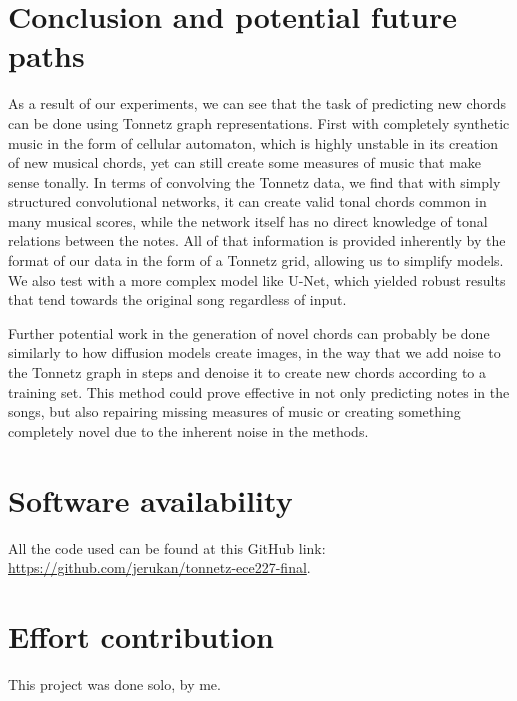 \documentclass[
	a4paper, %
	10pt, %
	unnumberedsections, %
	twoside, %
]{LTJournalArticle}
\begin{document}
\section{Conclusion and potential future paths}

As a result of our experiments, we can see that the task of predicting new chords can be done using Tonnetz graph representations. First with completely synthetic music in the form of cellular automaton, which is highly unstable in its creation of new musical chords, yet can still create some measures of music that make sense tonally. In terms of convolving the Tonnetz data, we find that with simply structured convolutional networks, it can create valid tonal chords common in many musical scores, while the network itself has no direct knowledge of tonal relations between the notes. All of that information is provided inherently by the format of our data in the form of a Tonnetz grid, allowing us to simplify models. We also test with a more complex model like U-Net, which yielded robust results that tend towards the original song regardless of input.

Further potential work in the generation of novel chords can probably be done similarly to how diffusion models create images, in the way that we add noise to the Tonnetz graph in steps and denoise it to create new chords according to a training set. This method could prove effective in not only predicting notes in the songs, but also repairing missing measures of music or creating something completely novel due to the inherent noise in the methods.

\section{Software availability}

All the code used can be found at this GitHub link: \url{https://github.com/jerukan/tonnetz-ece227-final}.

\section{Effort contribution}

This project was done solo, by me.


\printbibliography %

\end{document}
